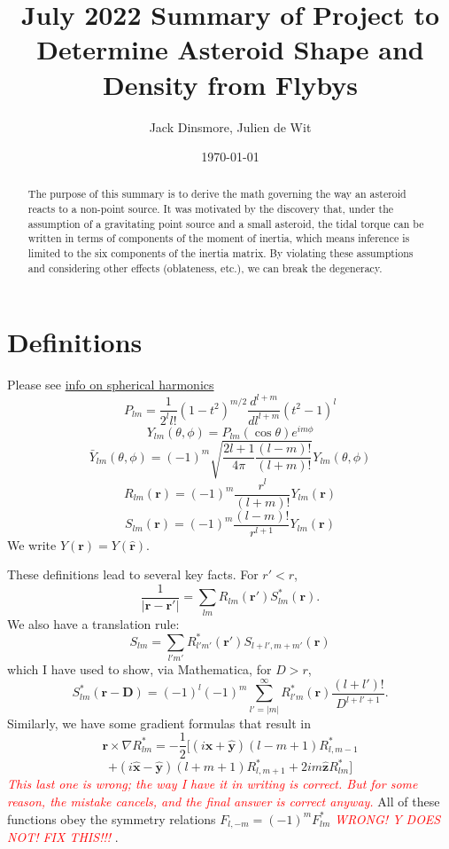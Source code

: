 \documentclass[aps,twocolumn,secnumarabic,balancelastpage,amsmath,amssymb,nofootinbib,floatfix]{revtex4-1}
\begin{document}
\title{July 2022 Summary of Project to Determine Asteroid Shape and Density from Flybys}
\author{Jack Dinsmore, Julien de Wit}
\date{\today}

\newcommand{\abs}[1]{\left| #1 \right|}
\newcommand{\parens}[1]{\left( #1 \right)}
\newcommand{\brackets}[1]{\left[ #1 \right]}
\newcommand{\comment}[1]{\textcolor{red}{\emph{ #1 }}}
\newcommand{\x}{\bm{\hat x}}
\newcommand{\y}{\bm{\hat y}}
\newcommand{\z}{\bm{\hat z}}
\newcommand{\J}{\mathcal{J}}
\newcommand{\M}{\mathcal{M}}
\newcommand{\R}{\mathcal{R}}





\begin{abstract}
    The purpose of this summary is to derive the math governing the way an asteroid reacts to a non-point source. It was motivated by the discovery that, under the assumption of a gravitating point source and a small asteroid, the tidal torque can be written in terms of components of the moment of inertia, which means inference is limited to the six components of the inertia matrix. By violating these assumptions and considering other effects (oblateness, etc.), we can break the degeneracy.
\end{abstract}

\maketitle



\section{Definitions}
Please see \href{https://citeseerx.ist.psu.edu/viewdoc/download?doi=10.1.1.56.5257&rep=rep1&type=pdf}{info on spherical harmonics}
$$P_{lm}=\frac{1}{2^ll!}(1-t^2)^{m/2} \frac{d^{l+m}}{dl^{l+m}}(t^2-1)^l$$
$$Y_{lm}(\theta, \phi) = P_{lm}(\cos\theta)e^{im\phi}$$
$$\bar Y_{lm}(\theta, \phi) = (-1)^m \sqrt{\frac{2l+1}{4\pi}\frac{(l-m)!}{(l+m)!}} Y_{lm}(\theta, \phi)$$
$$R_{lm}(\bm r) = (-1)^m \frac{r^l}{(l+m)!}Y_{lm}(\bm r)$$
$$S_{lm}(\bm r) = (-1)^m \frac{(l-m)!}{r^{l+1}}Y_{lm}(\bm r)$$
We write $Y(\bm r)=Y(\hat{\bm r})$.

These definitions lead to several key facts. For $r' < r$,
$$\frac{1}{|\bm r - \bm r'|}=\sum_{lm}R_{lm}(\bm r')S^*_{lm}(\bm r).$$
We also have a translation rule:
$$S_{lm}=\sum_{l'm'}R^*_{l'm'}(\bm r')S_{l+l',m+m'}(\bm r)$$
which I have used to show, via Mathematica, for $D > r$,
$$S_{lm}^*(\bm r - \bm D)=(-1)^l (-1)^m \sum_{l'=|m|}^\infty R_{l'm}^*(\bm r) \frac{(l+l')!}{D^{l+l'+1}}.$$
Similarly, we have some gradient formulas that result in
$$\bm r \times \nabla R_{lm}^*=-\frac{1}{2}[(i\x + \y)(l-m+1)R^*_{l,m-1}$$
$$+(i\x-\y)(l+m+1)R^*_{l,m+1}+2im\z R^*_{lm}]$$
\comment{This last one is wrong; the way I have it in writing is correct. But for some reason, the mistake cancels, and the final answer is correct anyway.}
All of these functions obey the symmetry relations $F_{l,-m}=(-1)^mF_{lm}^*$
\comment{WRONG! Y DOES NOT! FIX THIS!!!}.
\end{document}
